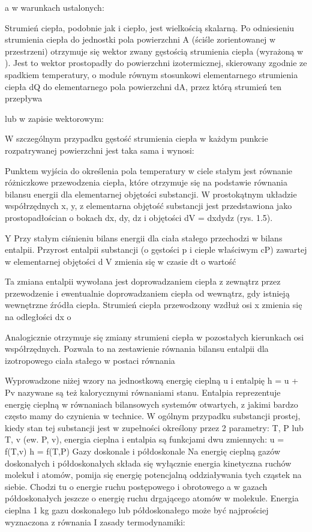 \documentclass[]{article}
\begin{document}
a w warunkach ustalonych:

Strumień ciepła, podobnie jak i ciepło, jest wielkością skalarną. Po
odniesieniu strumienia ciepła do jednostki pola powierzchni A (ściśle
zorientowanej w przestrzeni) otrzymuje się wektor zwany gęstością
strumienia ciepła (wyrażoną w ). Jest to wektor prostopadły do
powierzchni izotermicznej, skierowany zgodnie ze spadkiem temperatury, o
module równym stosunkowi elementarnego strumienia ciepła dQ do
elementarnego pola powierzchni dA, przez którą strumień ten przepływa

lub w zapisie wektorowym:

W szczególnym przypadku gęstość strumienia ciepła w każdym punkcie
rozpatrywanej powierzchni jest taka sama i wynosi:

Punktem wyjścia do określenia pola temperatury w ciele stałym jest
równanie różniczkowe przewodzenia ciepła, które otrzymuje się na
podstawie równania bilansu energii dla elementarnej objętości
substancji. W prostokątnym układzie współrzędnych x, y, z elementarna
objętość substancji jest przedstawiona jako prostopadłościan o bokach
dx, dy, dz i objętości dV = dxdydz (rys. 1.5).

Y Przy stałym ciśnieniu bilans energii dla ciała stałego przechodzi w
bilans entalpii. Przyrost entalpii substancji (o gęstości p i cieple
właściwym cP) zawartej w elementarnej objętości d V zmienia się w czasie
dt o wartość

Ta zmiana entalpii wywołana jest doprowadzaniem ciepła z zewnątrz przez
przewodzenie i ewentualnie doprowadzaniem ciepła od wewnątrz, gdy
istnieją wewnętrzne źródła ciepła. Strumień ciepła przewodzony wzdłuż
osi x zmienia się na odległości dx o

Analogicznie otrzymuje się zmiany strumieni ciepła w pozostałych
kierunkach osi współrzędnych. Pozwala to na zestawienie równania bilansu
entalpii dla izotropowego ciała stałego w postaci równania

Wyprowadzone niżej wzory na jednostkową energię cieplną u i entalpię h =
u + Pv nazywane są też kalorycznymi równaniami stanu. Entalpia
reprezentuje energię cieplną w równaniach bilansowych systemów
otwartych, z jakimi bardzo często mamy do czynienia w technice. W
ogólnym przypadku substancji prostej, kiedy stan tej substancji jest w
zupełności określony przez 2 parametry: T, P lub T, v (ew. P, v),
energia cieplna i entalpia są funkcjami dwu zmiennych: u = f(T,v) h =
f(T,P) Gazy doskonale i półdoskonale Na energię cieplną gazów
doskonałych i półdoskonałych składa się wyłącznie energia kinetyczna
ruchów molekuł i atomów, pomija się energię potencjalną oddziaływania
tych cząstek na siebie. Chodzi tu o energie ruchu postępowego i
obrotowego a w gazach półdoskonałych jeszcze o energię ruchu drgającego
atomów w molekule. Energia cieplna 1 kg gazu doskonałego lub
półdoskonałego może być najprościej wyznaczona z równania I zasady
termodynamiki:
\end{document}

